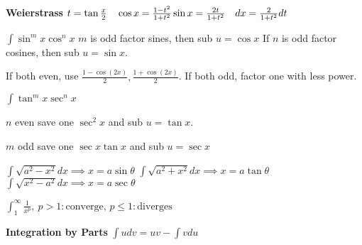 \documentclass[10pt,a4paper,landscape]{article}
\begin{document}
\begin{multicols*}{5}
	\textbf{Weierstrass} \newline
	$ t = \tan{ \frac{x}{2} } \quad \cos{ x } = \frac{ 1-t^2 }{ 1+t^2 }\newline \sin{ x } = \frac{2t}{1+t^2} \quad dx = \frac{2}{1+t^2}dt  $\newline

$\int \sin^m{ x } \cos^n{ x } $\newline
 $ m $ is odd factor sines, then sub $ u= \cos{ x }  $
If $ n $ is odd factor cosines, then sub $ u= \sin{ x }  $. 

If both even, use $ \frac{ 1- \cos{ (2x) }  }{ 2 }, \frac{ 1+ \cos(2x) }{ 2 }  $.
If both odd, factor one with less power.\newline

$\int \tan^mx \sec^nx$

$n$ even save one $ \sec^2x $ and sub $ u = \tan{ x }  $. 

$m$ odd save one $ \sec x \tan{ x } $ and sub $ u = \sec x $ \newline

$\int \sqrt{ a^2-x^2 } dx \implies x = a \sin{ \theta }$
$\int \sqrt{ a^2+x^2 } dx \implies x = a \tan{ \theta }$
$\int \sqrt{ x^2-a^2 } dx \implies x = a \sec{\theta}$ 

$ \int^{\infty}_{1} \frac{1}{x^p} ,\ p>1 : \text{converge, } p 	\leq 1 : \text{diverges} $


	\textbf{Integration by Parts}\newline
	$ \int u dv = uv-\int v du $


\end{multicols*}
\end{document}
